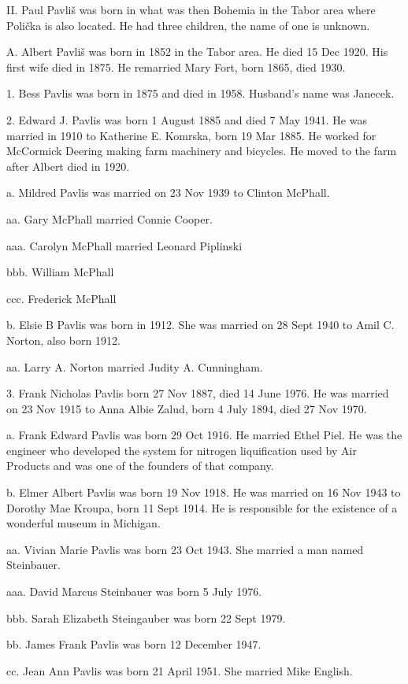 \documentclass[a4paper]{article}
\begin{document}
II. Paul Pavli\v{s} was born in what was then Bohemia in the Tabor area where Poli\v{c}ka is also located.  He had three children, the name of one is unknown.

A. Albert Pavli\v{s} was born in 1852 in the Tabor area.  He died 15 Dec 1920.  His first wife died in 1875.  He remarried Mary Fort, born 1865, died 1930.  

1. Bess Pavlis was born in 1875 and died in 1958.  Husband's name was Janecek.

2. Edward J. Pavlis was born 1 August 1885 and died 7 May 1941.  He was married in 1910 to Katherine E. Komrska, born 19 Mar 1885.  He worked for McCormick Deering making farm machinery and bicycles.  He moved to the farm after Albert died in 1920.  

a. Mildred Pavlis was married on 23 Nov 1939 to Clinton McPhall.

aa. Gary McPhall married Connie Cooper.

aaa. Carolyn McPhall married Leonard Piplinski
		
bbb. William McPhall 

ccc. Frederick McPhall

b. Elsie B Pavlis was born in 1912.  She was married on 28 Sept 1940 to Amil C. Norton, also born 1912. 

aa. Larry A. Norton married Judity A. Cunningham.  

3. Frank Nicholas Pavlis born 27 Nov 1887, died 14 June 1976.  He was married on 23 Nov 1915 to Anna Albie Zalud, born 4 July 1894, died 27 Nov 1970.  

a. Frank Edward Pavlis was born 29 Oct 1916.  He married Ethel Piel. He was the engineer who developed the system for nitrogen liquification used by Air Products and was one of the founders of that company.

b. Elmer Albert Pavlis was born 19 Nov 1918.  He was married on 16 Nov 1943 to Dorothy Mae Kroupa, born 11 Sept 1914.  He is responsible for the existence of a wonderful museum in Michigan.

aa. Vivian Marie Pavlis was born 23 Oct 1943.  She married a man named Steinbauer.

aaa. David Marcus Steinbauer was born 5 July 1976.

bbb. Sarah Elizabeth Steingauber was born 22 Sept 1979.

bb. James Frank Pavlis was born 12 December 1947.

cc. Jean Ann Pavlis was born 21 April 1951.  She married Mike English.  
\end{document}
